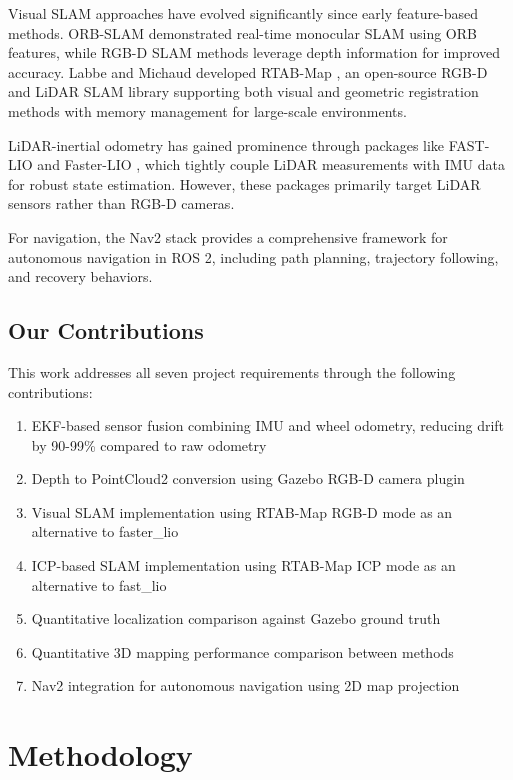 \documentclass[conference]{IEEEtran}
\begin{document}
Visual SLAM approaches have evolved significantly since early feature-based methods. ORB-SLAM \cite{orbslam} demonstrated real-time monocular SLAM using ORB features, while RGB-D SLAM methods leverage depth information for improved accuracy. Labbe and Michaud developed RTAB-Map \cite{rtabmap}, an open-source RGB-D and LiDAR SLAM library supporting both visual and geometric registration methods with memory management for large-scale environments.

LiDAR-inertial odometry has gained prominence through packages like FAST-LIO \cite{fastlio} and Faster-LIO \cite{fasterlio}, which tightly couple LiDAR measurements with IMU data for robust state estimation. However, these packages primarily target LiDAR sensors rather than RGB-D cameras.

For navigation, the Nav2 stack \cite{nav2} provides a comprehensive framework for autonomous navigation in ROS 2, including path planning, trajectory following, and recovery behaviors.

\subsection{Our Contributions}

This work addresses all seven project requirements through the following contributions:

\begin{enumerate}
    \item EKF-based sensor fusion combining IMU and wheel odometry, reducing drift by 90-99\% compared to raw odometry
    \item Depth to PointCloud2 conversion using Gazebo RGB-D camera plugin
    \item Visual SLAM implementation using RTAB-Map RGB-D mode as an alternative to faster\_lio
    \item ICP-based SLAM implementation using RTAB-Map ICP mode as an alternative to fast\_lio
    \item Quantitative localization comparison against Gazebo ground truth
    \item Quantitative 3D mapping performance comparison between methods
    \item Nav2 integration for autonomous navigation using 2D map projection
\end{enumerate}

\section{Methodology}
\end{document}
